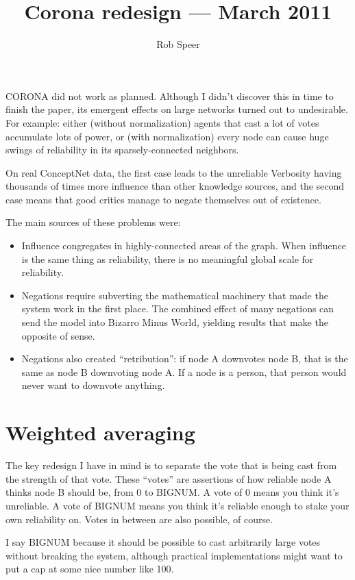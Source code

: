 \documentclass{article}
\title{Corona redesign --- March 2011}
\author{Rob Speer}
\begin{document}
\maketitle

CORONA did not work as planned. Although I didn't discover this in time to
finish the paper, its emergent effects on large networks turned out to
undesirable.  For example: either (without normalization) agents that cast a
lot of votes accumulate lots of power, or (with normalization) every node can
cause huge swings of reliability in its sparsely-connected neighbors.

On real ConceptNet data, the first case leads to the unreliable Verbosity
having thousands of times more influence than other knowledge sources, and the
second case means that good critics manage to negate themselves out of
existence.

The main sources of these problems were:
\begin{itemize}
\item Influence congregates in highly-connected areas of the graph. When influence
  is the same thing as reliability, there is no meaningful global scale for
  reliability.
\item Negations require subverting the mathematical machinery that made the system
  work in the first place. The combined effect of many negations can send the
  model into Bizarro Minus World, yielding results that make the opposite of
  sense.
\item Negations also created ``retribution'': if node A downvotes node B, that is the
  same as node B downvoting node A. If a node is a person, that person would
  never want to downvote anything.
\end{itemize}
\section{Weighted averaging}

The key redesign I have in mind is to separate the vote that is being cast from
the strength of that vote. These ``votes'' are assertions of how reliable node A
thinks node B should be, from 0 to BIGNUM. A vote of 0 means you think it's
unreliable. A vote of BIGNUM means you think it's reliable enough to stake your
own reliability on. Votes in between are also possible, of course.

I say BIGNUM because it should be possible to cast arbitrarily large votes
without breaking the system, although practical implementations might want to
put a cap at some nice number like 100.
\end{document}
